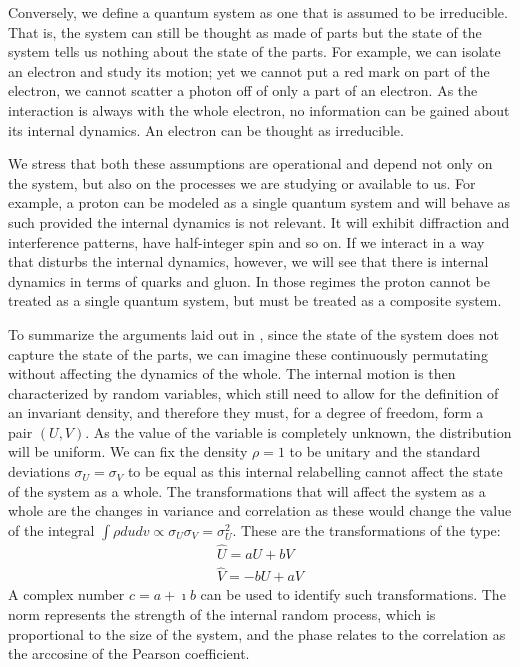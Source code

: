 \documentclass{ws-ijqi}
\begin{document}
Conversely, we define a quantum system as one that is assumed to be irreducible. That is, the system can still be thought as made of parts but the state of the system tells us nothing about the state of the parts. For example, we can isolate an electron and study its motion; yet we cannot put a red mark on part of the electron, we cannot scatter a photon off of only a part of an electron. As the interaction is always with the whole electron, no information can be gained about its internal dynamics. An electron can be thought as irreducible.

We stress that both these assumptions are operational and depend not only on the system, but also on the processes we are studying or available to us. For example, a proton can be modeled as a single quantum system and will behave as such provided the internal dynamics is not relevant. It will exhibit diffraction and interference patterns, have half-integer spin and so on. If we interact in a way that disturbs the internal dynamics, however, we will see that there is internal dynamics in terms of quarks and gluon. In those regimes the proton cannot be treated as a single quantum system, but must be treated as a composite system.

To summarize the arguments laid out in \cite{Carc1}, since the state of the system does not capture the state of the parts, we can imagine these continuously permutating without affecting the dynamics of the whole. The internal motion is then characterized by random variables, which still need to allow for the definition of an invariant density, and therefore they must, for a degree of freedom, form a pair $(U,V)$. As the value of the variable is completely unknown, the distribution will be uniform. We can fix the density $\rho=1$ to be unitary and the standard deviations $\sigma_U=\sigma_V$ to be equal as this internal relabelling cannot affect the state of the system as a whole. The transformations that will affect the system as a whole are the changes in variance and correlation as these would change the value of the integral $\int \rho dudv \propto \sigma_U\sigma_V = \sigma_U^2$. These are the transformations of the type:
\begin{equation}
	\begin{aligned}
	\hat{U} = a U + b V \\
	\hat{V} = -b U + a V
	\end{aligned}
\end{equation}
A complex number $c=a + \imath b$ can be used to identify such transformations. The norm represents the strength of the internal random process, which is proportional to the size of the system, and the phase relates to the correlation as the arccosine of the Pearson coefficient.
\end{document}
